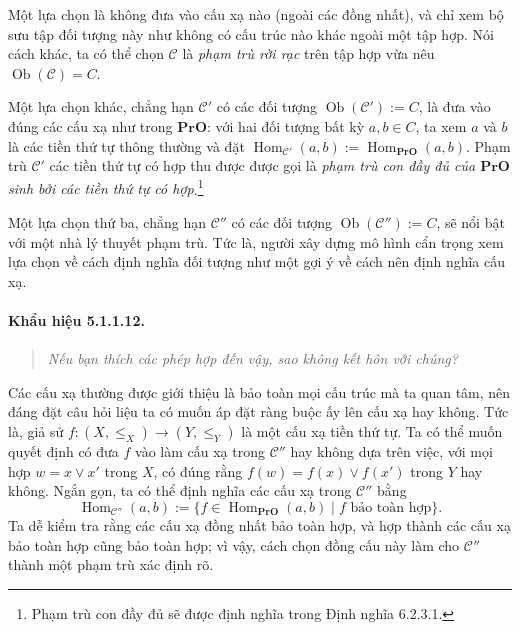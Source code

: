 Một lựa chọn là không đưa vào cấu xạ nào (ngoài các đồng nhất), và chỉ xem bộ sưu tập đối tượng này như không có cấu trúc nào khác ngoài một tập hợp. Nói cách khác, ta có thể chọn $\mathcal C$ là \emph{phạm trù rời rạc} trên tập hợp vừa nêu $\operatorname{Ob}(\mathcal C)=C$.

Một lựa chọn khác, chẳng hạn $\mathcal C'$ có các đối tượng $\operatorname{Ob}(\mathcal C'):=C$, là đưa vào đúng các cấu xạ như trong $\mathbf{PrO}$: với hai đối tượng bất kỳ $a,b\in C$, ta xem $a$ và $b$ là các tiền thứ tự thông thường và đặt $\operatorname{Hom}_{\mathcal C'}(a,b):=\operatorname{Hom}_{\mathbf{PrO}}(a,b)$. Phạm trù $\mathcal C'$ các tiền thứ tự có hợp thu được được gọi là \emph{phạm trù con đầy đủ của $\mathbf{PrO}$ sinh bởi các tiền thứ tự có hợp}.\footnote{Phạm trù con đầy đủ sẽ được định nghĩa trong Định nghĩa 6.2.3.1.}

Một lựa chọn thứ ba, chẳng hạn $\mathcal C''$ có các đối tượng $\operatorname{Ob}(\mathcal C''):=C$, sẽ nổi bật với một nhà lý thuyết phạm trù. Tức là, người xây dựng mô hình cẩn trọng xem lựa chọn về cách định nghĩa đối tượng như một gợi ý về cách nên định nghĩa cấu xạ.
\paragraph{Khẩu hiệu 5.1.1.12.}
\begin{quote}\emph{Nếu bạn thích các phép hợp đến vậy, sao không kết hôn với chúng?}\end{quote}
Các cấu xạ thường được giới thiệu là bảo toàn mọi cấu trúc mà ta quan tâm, nên đáng đặt câu hỏi liệu ta có muốn áp đặt ràng buộc ấy lên cấu xạ hay không. Tức là, giả sử $f:(X,\leq_X)\to(Y,\leq_Y)$ là một cấu xạ tiền thứ tự. Ta có thể muốn quyết định có đưa $f$ vào làm cấu xạ trong $\mathcal C''$ hay không dựa trên việc, với mọi hợp $w=x\vee x'$ trong $X$, có đúng rằng $f(w)=f(x)\vee f(x')$ trong $Y$ hay không. Ngắn gọn, ta có thể định nghĩa các cấu xạ trong $\mathcal C''$ bằng
\[\operatorname{Hom}_{\mathcal C''}(a,b):=\{f\in\operatorname{Hom}_{\mathbf{PrO}}(a,b)\mid f\text{ bảo toàn hợp}\}.\]
Ta dễ kiểm tra rằng các cấu xạ đồng nhất bảo toàn hợp, và hợp thành các cấu xạ bảo toàn hợp cũng bảo toàn hợp; vì vậy, cách chọn đồng cấu này làm cho $\mathcal C''$ thành một phạm trù xác định rõ.

